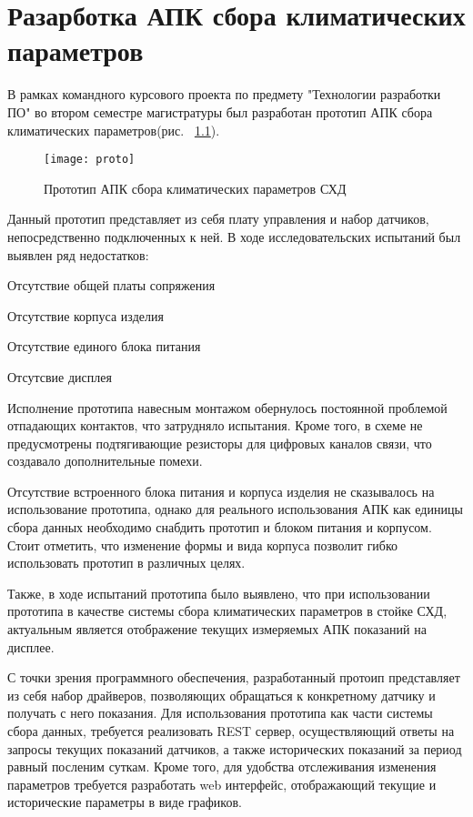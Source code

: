 
\chapter{Разарботка АПК сбора климатических параметров}

В рамках командного курсового проекта по предмету "Технологии разработки ПО" во втором семестре магистратуры был разработан прототип АПК сбора климатических параметров(рис. ~\ref{fig:proto}).

\begin{figure}[H]
	\centering
	\texttt{[image: proto]}
	\caption{Прототип АПК сбора климатических параметров СХД}
	\label{fig:proto}
\end{figure}
Данный прототип представляет из себя плату управления и набор датчиков, непосредственно подключенных к ней. В ходе исследовательских испытаний был выявлен ряд недостатков: 
\begin{itemize*}
	\item{Отсутствие общей платы сопряжения}
	\item{Отсутствие корпуса изделия}
	\item{Отсутствие единого блока питания}
	\item{Отсутсвие дисплея}
\end{itemize*}

Исполнение прототипа навесным монтажом обернулось постоянной проблемой отпадающих контактов, что затрудняло испытания. Кроме того, в схеме не предусмотрены подтягивающие резисторы для цифровых каналов связи, что создавало дополнительные помехи. 

Отсутствие встроенного блока питания и корпуса изделия не сказывалось на использование прототипа, однако для реального использования АПК как единицы сбора данных необходимо снабдить прототип и блоком питания и корпусом. Стоит отметить, что изменение формы и вида корпуса позволит гибко использовать прототип в различных целях.

Также, в ходе испытаний прототипа было выявлено, что при использовании прототипа в качестве системы сбора климатических параметров в стойке СХД, актуальным является отображение текущих измеряемых АПК показаний на дисплее. 

С точки зрения программного обеспечения, разработанный протоип представляет из себя набор драйверов, позволяющих обращаться к конкретному датчику и получать с него показания. Для использования прототипа как части системы сбора данных, требуется реализовать REST сервер, осуществляющий ответы на запросы текущих показаний датчиков, а также исторических показаний за период равный посленим суткам. Кроме того, для удобства отслеживания изменения параметров требуется разработать web интерфейс, отображающий текущие и исторические параметры в виде графиков.

